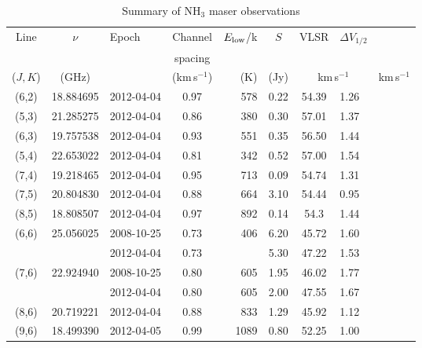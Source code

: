 \documentclass[oldversion]{aa}
\begin{document}
\begin{table*}
\label{tab1}
\caption[]{Summary of NH$_3$ maser observations}
\begin{flushleft}
\begin{tabular}{cclcrccl}
\hline
Line      &  $\nu$    &  Epoch        & Channel        & $E_{\rm low}$/k & $S$   & VLSR  & $\Delta V_{1/2}$ \\
          &           &               & spacing        &                 &       &                &                  \\
($J,K$)   &  (GHz)    &               & (km\,s$^{-1}$) &    (K)          & (Jy)  & \multicolumn{2}{c}{km\,s$^{-1}$} & \multicolumn{2}{c}{km\,s$^{-1}$}\\
\hline 
  (6,2)   & 18.884695 & 2012-04-04    &  0.97          &   578           & 0.22  & 54.39 & 1.26           \\ 
  (5,3)   & 21.285275 & 2012-04-04 &  0.86          &   380           & 0.30  & 57.01 & 1.37             \\
  (6,3)   & 19.757538 & 2012-04-04 &  0.93          &   551           & 0.35  & 56.50 & 1.44             \\
  (5,4)   & 22.653022 & 2012-04-04 &  0.81          &   342           & 0.52  & 57.00 & 1.54             \\
  (7,4)   & 19.218465 & 2012-04-04 &  0.95          &   713           & 0.09  & 54.74 & 1.31             \\
  (7,5)   & 20.804830 & 2012-04-04 &  0.88          &   664           & 3.10  & 54.44 & 0.95             \\
  (8,5)   & 18.808507 & 2012-04-04 &  0.97          &   892           & 0.14  & 54.3 & 1.44             \\
  (6,6)   & 25.056025 & 2008-10-25 &  0.73          &   406           & 6.20  & 45.72 & 1.60             \\
          &           & 2012-04-04 &  0.73          &                 & 5.30  & 47.22 & 1.53             \\
  (7,6)   & 22.924940 & 2008-10-25 &  0.80          &   605           & 1.95  & 46.02 & 1.77             \\
          &           & 2012-04-04 &  0.80          &   605           & 2.00  & 47.55 & 1.67             \\
  (8,6)   & 20.719221 & 2012-04-04 &  0.88          &   833           & 1.29  & 45.92 & 1.12             \\
  (9,6)   & 18.499390 & 2012-04-05  &  0.99          &  1089           & 0.80  & 52.25 & 1.00             \\

\end{tabular}
\end{flushleft}
\end{table*}
\end{document}
